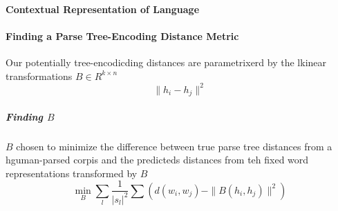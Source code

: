 \documentclass[10pt]{report}
\begin{document}
\paragraph{Contextual Representation of Language} %
\paragraph{Finding a Parse Tree-Encoding Distance Metric} Our potentially tree-encodicding distances are parametrixerd by the lkinear transformations $B\in R^{k\times n}$
$$\|h_i-h_j\|^2$$ %
\subparagraph{Finding $B$} $B$ chosen to minimize the difference between true parse tree distances from a hguman-parsed corpis and the predicteds distances from teh fixed word representations transformed by $B$
$$\min_B\sum_l\frac{1}{|s_l|^2}\sum\left(d(w_i,w_j)-\|B(h_i,h_j)\|^2\right)$$
\end{document}
